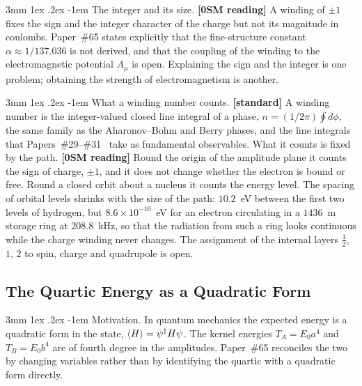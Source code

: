 \documentclass[%
 reprint, amsmath,amssymb, aps, prb, ]{revtex4-2}
\makeatletter
\numberwithin{equation}{section}
\renewcommand\paragraph{%
  \@startsection{paragraph}{4}{\z@}%
    {3mm \@plus 1ex \@minus .2ex}%
    {-1em}%
    {\normalfont\normalsize\itshape}}
\makeatother
\begin{document}
\paragraph{The integer and its size.} \textbf{[0SM reading]} A winding of $\pm1$ fixes the sign and the integer character of the charge but not its magnitude in coulombs. Paper~\#65 states explicitly that the fine-structure constant $\alpha \approx 1/137.036$ is not derived, and that the coupling of the winding to the electromagnetic potential $A_\mu$ is open. Explaining the sign and the integer is one problem; obtaining the strength of electromagnetism is another.

\paragraph{What a winding number counts.} \textbf{[standard]} A winding number is the integer-valued closed line integral of a phase, $n = (1/2\pi)\oint d\phi$, the same family as the Aharonov--Bohm and Berry phases, and the line integrals that Papers~\#29--\#31~\cite{hanamura29,hanamura30,hanamura31} take as fundamental observables. What it counts is fixed by the path. \textbf{[0SM reading]} Round the origin of the amplitude plane it counts the sign of charge, $\pm1$, and it does not change whether the electron is bound or free. Round a closed orbit about a nucleus it counts the energy level. The spacing of orbital levels shrinks with the size of the path: $10.2$~eV between the first two levels of hydrogen, but $8.6\times10^{-10}$~eV for an electron circulating in a $1436$~m storage ring at $208.8$~kHz, so that the radiation from such a ring looks continuous while the charge winding never changes. The assignment of the internal layers $\tfrac12$, $1$, $2$ to spin, charge and quadrupole is open.

\subsection{The Quartic Energy as a Quadratic Form}
\label{subsec:g_hopf}

\paragraph{Motivation.} In quantum mechanics the expected energy is a quadratic form in the state, $\expval{H} = \psi^{\dagger}H\psi$. The kernel energies $T_A = E_0a^{4}$ and $T_B = E_0b^{4}$ are of fourth degree in the amplitudes. Paper~\#65 reconciles the two by changing variables rather than by identifying the quartic with a quadratic form directly.
\end{document}
